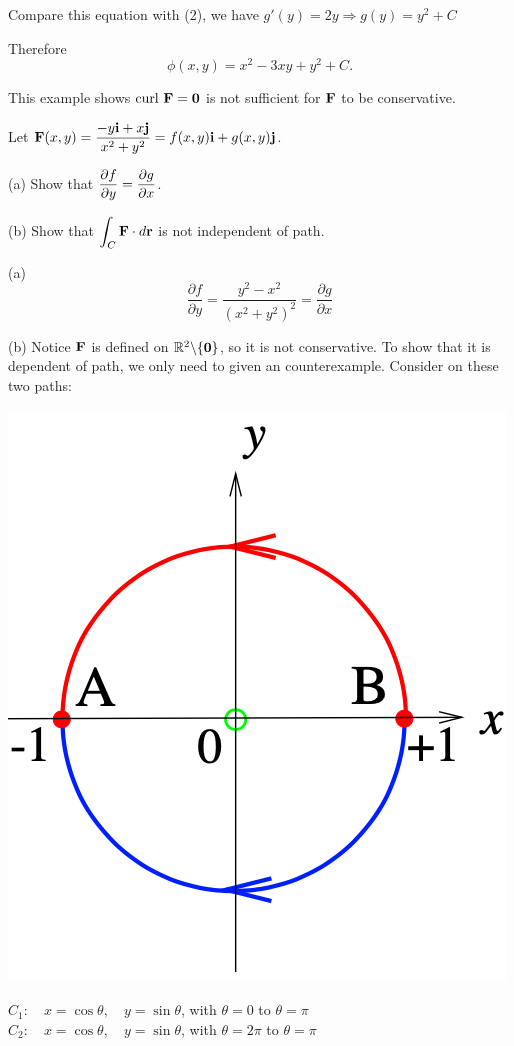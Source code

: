 \begin{spacing}{1.3}
    Compare this equation with (2), we have $g'(y)=2y \Rightarrow g(y)=y^2+C$

    Therefore $$\phi(x, y)=x^2-3xy+y^2+C.$$

    \newpage
    {\blue This example shows ${\rm curl\ } {\bf F}={\bf 0}$ is not sufficient for ${\bf F}$ to be conservative.}

    \eg Let $\displaystyle \mathbf{F}(x, y)=\frac{-y \mathbf{i}+x \mathbf{j}}{x^{2}+y^{2}}=f(x, y) \mathbf{i}+g(x, y) \mathbf{j}$.
    
    (a) Show that $\displaystyle \frac{\partial f}{\partial y}=\frac{\partial g}{\partial x}$.

    (b) Show that $\displaystyle \int_{C} \mathbf{F} \cdot d \mathbf{r}$ is not independent of path.
    
    \sol (a)$$\frac{\partial f}{\partial y}=\frac{y^{2}-x^{2}}{\left(x^{2}+y^{2}\right)^{2}}=\frac{\partial g}{\partial x}$$

    (b) Notice ${\bf F}$ is defined on $\mathbb{R}^2\backslash \{{\bf 0}\}$, so it is not conservative.
    To show that it is dependent of path, we only need to given an counterexample. Consider on these two paths:
    \begin{center}
        \includegraphics[scale=0.4]{images/Ch15-ex2.3.png}
    \end{center}
    $C_{1}: \quad x=\cos \theta, \quad y=\sin \theta$, with $\theta = 0$ to $\theta = \pi$\\
    $C_{2}: \quad x=\cos \theta, \quad y=\sin \theta$, with $\theta = 2\pi$ to $\theta = \pi$


\end{spacing}
